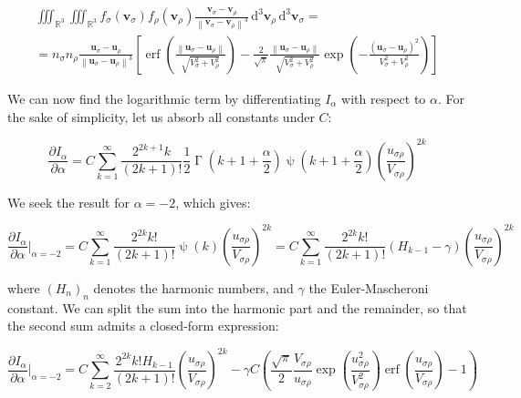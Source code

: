 \begin{gather*}
    \iiint_{\mathbb{R}^3}\iiint_{\mathbb{R}^3}f_\sigma(\mathbf{v}_\sigma)f_\rho(\mathbf{v}_\rho)\frac{\mathbf{v}_\sigma-\mathbf{v}_\rho}{\left\|\mathbf{v}_\sigma-\mathbf{v}_\rho\right\|^3}\,\mathrm{d^3}\mathbf{v}_\rho\,\mathrm{d^3}\mathbf{v}_\sigma=\\
    =n_\sigma n_\rho\frac{\mathbf{u}_{\sigma}-\mathbf{u}_\rho}{\left\|\mathbf{u}_\sigma-\mathbf{u}_\rho\right\|^3}\left[\operatorname{erf}{\left(\frac{\left\|\mathbf{u}_\sigma-\mathbf{u}_\rho\right\|}{\sqrt{V_\sigma^2+V_\rho^2}}\right)}-\frac{2}{\sqrt{\pi}}\frac{\left\|\mathbf{u}_\sigma-\mathbf{u}_\rho\right\|}{\sqrt{V_\sigma^2+V_\rho^2}}\exp{\left(-\frac{\left(\mathbf{u}_\sigma-\mathbf{u}_\rho\right)^2}{V_\sigma^2+V_\rho^2}\right)}\right]
\end{gather*}

 We can now find the logarithmic term by differentiating $I_\alpha$ with respect to $\alpha$. For the sake of simplicity, let us absorb all constants under $C$:

\begin{equation*}
    \frac{\partial I_\alpha}{\partial \alpha}=C\sum_{k=1}^\infty \frac{2^{2k+1}k}{(2k+1)!}\frac{1}{2}\operatorname{\Gamma}{\left(k+1+\frac{\alpha}{2}\right)}\operatorname{\psi}{\left(k+1+\frac{\alpha}{2}\right)}\left(\frac{u_{\sigma\rho}}{V_{\sigma\rho}}\right)^{2k}
\end{equation*}

We seek the result for $\alpha=-2$, which gives:

\begin{equation*}
    \frac{\partial I_\alpha}{\partial \alpha}\biggr|_{\alpha=-2}=C\sum_{k=1}^\infty \frac{2^{2k}k!}{(2k+1)!}\operatorname{\psi}{\left(k\right)}\left(\frac{u_{\sigma\rho}}{V_{\sigma\rho}}\right)^{2k}=C\sum_{k=1}^\infty\frac{2^{2k}k!}{(2k+1)!}\left(H_{k-1}-\gamma\right)\left(\frac{u_{\sigma\rho}}{V_{\sigma\rho}}\right)^{2k}
\end{equation*}

where $(H_{n})_n$ denotes the harmonic numbers, and $\gamma$ the Euler-Mascheroni constant. We can split the sum into the harmonic part and the remainder, so that the second sum admits a closed-form expression:

\begin{equation*}
    \frac{\partial I_\alpha}{\partial \alpha}\biggr|_{\alpha=-2}=C\sum_{k=2}^\infty \frac{2^{2k}k!H_{k-1}}{(2k+1)!}\left(\frac{u_{\sigma\rho}}{V_{\sigma\rho}}\right)^{2k}-\gamma C\left(\frac{\sqrt{\pi}}{2}\frac{V_{\sigma\rho}}{u_{\sigma\rho}}\exp{\left(\frac{u_{\sigma\rho}^2}{V_{\sigma\rho}^2}\right)}\operatorname{erf}{\left(\frac{u_{\sigma\rho}}{V_{\sigma\rho}}\right)}-1\right)
\end{equation*}

